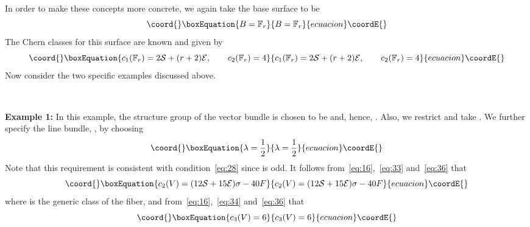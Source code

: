 \documentclass[a4paper,12pt]{article}
\numberwithin{equation}{section}
\def\cE{{\mathcal E}}
\def\cN{{\mathcal N}}
\def\cS{{\mathcal S}}
\theoremstyle{plain}
\begin{document}
In order to make these concepts more concrete, we again take the
base surface to be
\begin{equation}\coord{}\boxEquation{
B = {\mathbb F}_{r}
\label{eq:35}
}{
B = {\mathbb F}_{r}
}{ecuacion}\coordE{}\end{equation}
The Chern classes for this surface are known and given by
\begin{equation}\coord{}\boxEquation{
c_{1}({\mathbb F}_{r})=2\cS+(r+2)\cE, \qquad c_{2}({\mathbb F}_{r})=4
\label{eq:36}
}{
c_{1}({\mathbb F}_{r})=2\cS+(r+2)\cE, \qquad c_{2}({\mathbb F}_{r})=4
}{ecuacion}\coordE{}\end{equation}
Now consider the two specific examples discussed above.


\smallskip

\

\noindent
{\bf Example 1:} \quad
In this example, the structure group of the vector bundle is chosen to be
\coordHE{} and, hence, \coordHE{}. Also, we restrict \coordHE{} and take
\myHighlight{$\eta=12\cS+15\cE$}\coordHE{}. 
We further specify the line bundle, \myHighlight{$\cN$}\coordHE{}, by choosing
\begin{equation}\coord{}\boxEquation{
\lambda=\frac{1}{2}
\label{eq:37}
}{
\lambda=\frac{1}{2}
}{ecuacion}\coordE{}\end{equation}
Note that this requirement 
is consistent with condition~\eqref{eq:28} since \coordHE{} is odd.
It follows from~\eqref{eq:16},~\eqref{eq:33} and~\eqref{eq:36} that
\begin{equation}\coord{}\boxEquation{
c_{2}(V)= (12\cS+15\cE)\sigma-40F
\label{eq:38}
}{
c_{2}(V)= (12\cS+15\cE)\sigma-40F
}{ecuacion}\coordE{}\end{equation}
where \coordHE{} is the generic class of the fiber,
and from~\eqref{eq:16},~\eqref{eq:34} and~\eqref{eq:36} that
\begin{equation}\coord{}\boxEquation{
c_{3}(V)= 6
\label{eq:39}
}{
c_{3}(V)= 6
}{ecuacion}\coordE{}\end{equation}


\smallskip

\
\end{document}
